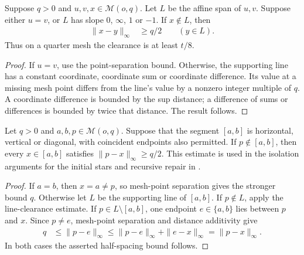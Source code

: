 \begin{lemma}
    \label{thm:area_law_affine_mesh_line_clearance}
    \leanok
    Suppose $q>0$ and $u,v,x\in\mathcal M(o,q)$. Let $L$ be the
    affine span of $u,v$. Suppose either $u=v$, or $L$ has slope
    $0$, $\infty$, $1$ or $-1$. If $x\notin L$, then
    \begin{align}
        \|x-y\|_\infty & \ge q/2\qquad(y\in L).
    \end{align}
    Thus on a quarter mesh the clearance is at least $t/8$.
\end{lemma}
\begin{proof}\leanok
    If $u=v$, use the point-separation bound. Otherwise, the supporting
    line has a constant coordinate, coordinate sum or coordinate
    difference. Its value at a missing mesh point differs from the
    line's value by a nonzero integer multiple of $q$. A coordinate
    difference is bounded by the sup distance; a difference of sums
    or differences is bounded by twice that distance. The result follows.
\end{proof}

\begin{lemma}
    \label{thm:area_law_affine_mesh_segment_clearance}
    \leanok
    Let $q>0$ and $a,b,p\in\mathcal M(o,q)$. Suppose that the segment
    $[a,b]$ is horizontal, vertical or diagonal, with coincident endpoints
    also permitted. If $p\notin[a,b]$, then every $x\in[a,b]$ satisfies
    $\|p-x\|_\infty\ge q/2$.
    This estimate is used in the isolation arguments for the initial stars
    and recursive repair in \cite[Section~11]{OpenAI2026AreaLaw}.
\end{lemma}
\begin{proof}\leanok
    If $a=b$, then $x=a\ne p$, so mesh-point separation gives the
    stronger bound $q$. Otherwise let $L$ be the supporting line of
    $[a,b]$. If $p\notin L$, apply the line-clearance estimate.
    If $p\in L\setminus[a,b]$, one endpoint $e\in\{a,b\}$ lies
    between $p$ and $x$. Since $p\ne e$, mesh-point separation and
    distance additivity give
    \begin{align}
        q & \le\|p-e\|_\infty
        \le\|p-e\|_\infty+\|e-x\|_\infty
        =\|p-x\|_\infty.
    \end{align}
    In both cases the asserted half-spacing bound follows.
\end{proof}

